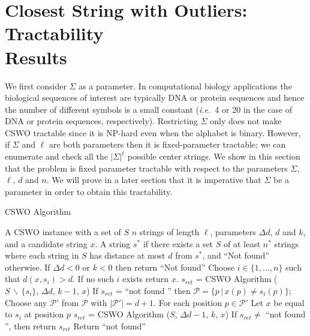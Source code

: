 \section{{\sc Closest String with Outliers}: Tractability \\ Results}

We first consider $\Sigma$ as a parameter.  In computational biology applications the biological sequences of interest are typically DNA or protein sequences and hence the number of different symbols is a small constant ({\em i.e.}\ 4 or 20 in the case of DNA or protein sequences, respectively).  Restricting $\Sigma$ only does not make {\sc CSWO} tractable since it is NP-hard even when the alphabet is binary. However, if $\Sigma$ and $\ell$ are both parameters then it is fixed-parameter tractable; we can enumerate and check all the $|\Sigma|^{\ell}$ possible center strings.  We show in this section that the problem is fixed parameter tractable with respect to the parameters $\Sigma$, $\ell$, $d$ and $n$.  We will prove in a later section that it is imperative that $\Sigma$ be a parameter in order to obtain this tractability. 

\begin{algorithm*}[h]
\caption{CSWO Algorithm}
\begin{algorithmic}
 A {\sc CSWO} instance with a set of $S$ $n$ strings of length $\ell$, parameters $\Delta d$, $d$ and $k$, and a candidate string $x$.
 A string $s^*$ if there exists a set $S$ of at least $n^*$ strings where each string in $S$ has distance at most $d$ from $s^*$, and ``Not found'' otherwise.
\STATE
\STATE If $\Delta d < 0$ or $k < 0$ then return ``Not found''
\STATE Choose $i \in \{1, \ldots, n\}$ such that $d(x, s_i) > d$. If no such $i$ exists return $x$.
\STATE $s_{ret}$ =  {\sc CSWO} Algorithm ($S \, \backslash \, \{ s_i \}$, $\Delta d$, $k - 1$, $x$)
\STATE If $s_{ret}$ = ``not found '' then
\STATE \hspace{5mm} $\mathcal{P} = \{p \, |  \, x(p) \ne s_i(p)\}$;
\STATE \hspace{5mm} Choose any $\mathcal{P}'$ from $\mathcal{P}$ with $|\mathcal{P}'| = d + 1$.
\STATE \hspace{5mm} For each position $p \in \mathcal{P}'$
\STATE \hspace{10mm} Let $x$ be equal to $s_i$ at position $p$ 
\STATE \hspace{10mm} $s_{ret}$ = {\sc CSWO} Algorithm ($S$, $\Delta d - 1$, $k$, $x$) 
\STATE \hspace{10mm} If $s_{ret} \neq $ ``not found '', then return $s_{ret}$
\STATE Return ``not found''
\end{algorithmic}
\end{algorithm*}

